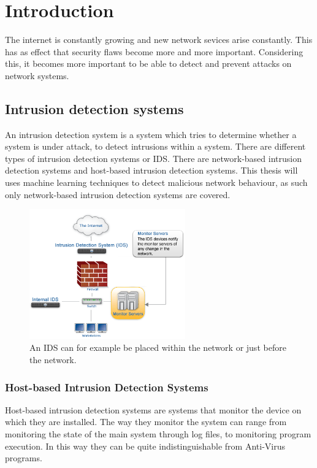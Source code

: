 
\chapter{Introduction} %

\label{Chapter1} %

The internet is constantly growing and new network sevices arise constantly. This has as effect that security flaws become more and more important. Considering this, it becomes more important to be able to detect and prevent attacks on network systems.

\section{Intrusion detection systems}
An intrusion detection system is a system which tries to determine whether a system is under attack, to detect intrusions within a system. There are different types of intrusion detection systems or IDS. There are network-based intrusion detection systems and host-based intrusion detection systems. This thesis will uses machine learning techniques to detect malicious network behaviour, as such only network-based intrusion detection systems are covered.
\begin{figure}[H]
\centering
\includegraphics[width=0.6\textwidth]{Figures/idsdiagram}
\decoRule
\caption[Possible placement of IDS]{An IDS can for example be placed within the network or just before the network.}
\label{fig:IDS}
\end{figure}
\subsection{Host-based Intrusion Detection Systems}
Host-based intrusion detection systems are systems that monitor the device on which they are installed. The way they monitor the system can range from monitoring the state of the main system through log files, to monitoring program execution. In this way they can be quite indistinguishable from Anti-Virus programs.

